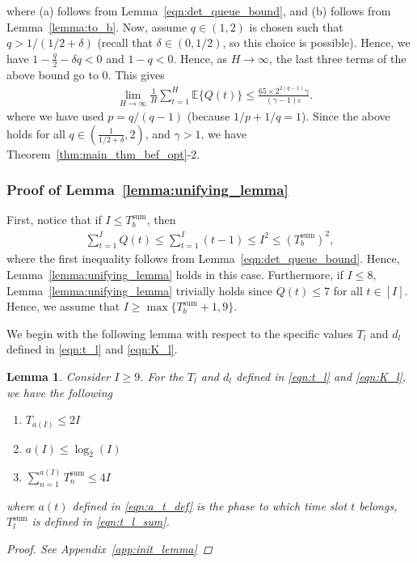 \documentclass[12pt,draftcls, onecolumn]{IEEEtran}
\newtheorem{lemma}{Lemma}
\begin{document}
where (a) follows from Lemma~\ref{eqn:det_queue_bound},  and (b) follows from Lemma~\ref{lemma:to_b}. Now, assume $q \in (1,2)$ is chosen such that $q> 1/(1/2+\delta)$ (recall that $\delta \in (0,1/2)$, so this choice is possible). Hence, we have $1-\frac{q}{2}-\delta q < 0$ and $1-q<0$. Hence, as $H \to \infty$, the last three terms of the above bound go to 0. This gives
\begin{align}
      &\lim_{H \to \infty}\frac{1}{H}\sum_{t=1}^{H} \mathbb{E}\{Q(t)\}   \leq  \frac{65\times 2^{2(q-1)}\gamma}{(\gamma-1) \varepsilon}.\nonumber
\end{align}
where we have used  $p = q/(q-1)$ (because $1/p+1/q = 1$).
Since the above holds for all $q \in \left(\frac{1}{1/2+\delta},2\right)$, and $\gamma > 1$, we have Theorem~\ref{thm:main_thm_bef_opt}-2.
\subsubsection{Proof of Lemma~\ref{lemma:unifying_lemma}}\label{sec:main_lemma}
First, notice that if $I \leq T^{\text{sum}}_b$, then
\begin{align}
    \sum_{t = 1} ^I Q(t) \leq \sum_{t = 1} ^I (t-1) \leq I^2 \leq (T_b^{\text{sum}})^2, \nonumber
\end{align} 
where the first inequality follows from Lemma~\ref{eqn:det_queue_bound}.
Hence, Lemma~\ref{lemma:unifying_lemma} holds in this case.  Furthermore, if $I \leq 8$, Lemma~\ref{lemma:unifying_lemma} trivially holds since $Q(t) \leq 7$ for all $t \in [I]$. Hence, we assume that $I \geq \max\{T^{\text{sum}}_b+1,9\}$.

We begin with the following lemma with respect to the specific values $T_l$ and $d_l$ defined in \eqref{eqn:t_l} and \eqref{eqn:K_l}.

\begin{lemma}\label{lemma:init_lemma}
   Consider $I \geq 9$. For the $T_l$ and $d_l$ defined in \eqref{eqn:t_l} and \eqref{eqn:K_l}, we have the following
    \begin{enumerate}
        \item $T_{a(I)} \leq 2I$
        \item $a(I) \leq \log_2(I)$
        \item $\sum_{n=1}^{a(I)} T^{\text{sum}}_n \leq 4I$
    \end{enumerate}
    where $a(t)$ defined in \eqref{eqn:a_t_def} is the phase to which time slot $t$ belongs, $T_l^{\text{sum}}$ is defined in \eqref{eqn:t_l_sum}.
    \begin{proof}
      See Appendix~\ref{app:init_lemma}
    \end{proof}
\end{lemma}
\end{document}
